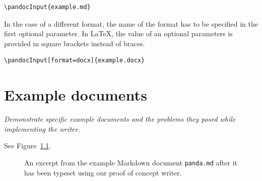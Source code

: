 \documentclass[
  digital,     %
  oneside,     %
  nosansbold,  %
  nocolorbold, %
  lof,         %
  nolot,       %
]{fithesis4}
\begin{document}
\noindent
\lstset{language=[LaTeX]TeX}
\begin{lstlisting}
\pandocInput{example.md}
\end{lstlisting}

\noindent
In the case of a different format, the name of the format has to be specified in the first optional parameter. In \LaTeX{}, the value of an optional parameters is provided in square brackets instead of braces.

\noindent
\lstset{language=[LaTeX]TeX}
\begin{lstlisting}
\pandocInput[format=docx]{example.docx}
\end{lstlisting}

\chapter{Example documents}
\emph{Demonstrate specific example documents and the problems they posed while implementing the writer.} \label{fig:html-browsers-typeset}

See Figure~\ref{fig:example-panda}.

\begin{figure}[tbhp]
\centering
\caption{An excerpt from the example Markdown document \texttt{panda.md} after it has been typeset using our proof of concept writer.}
\label{fig:example-panda}
\end{figure}
\end{document}
